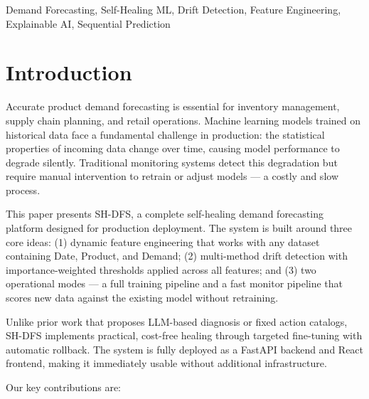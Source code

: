 \documentclass[conference]{IEEEtran}
\begin{document}
\begin{IEEEkeywords}
Demand Forecasting, Self-Healing ML, Drift Detection, Feature Engineering, Explainable AI, Sequential Prediction
\end{IEEEkeywords}

\section{Introduction}

Accurate product demand forecasting is essential for inventory management, supply chain planning, and retail operations. Machine learning models trained on historical data face a fundamental challenge in production: the statistical properties of incoming data change over time, causing model performance to degrade silently. Traditional monitoring systems detect this degradation but require manual intervention to retrain or adjust models — a costly and slow process.

This paper presents SH-DFS, a complete self-healing demand forecasting platform designed for production deployment. The system is built around three core ideas: (1) dynamic feature engineering that works with any dataset containing Date, Product, and Demand; (2) multi-method drift detection with importance-weighted thresholds applied across all features; and (3) two operational modes — a full training pipeline and a fast monitor pipeline that scores new data against the existing model without retraining.

Unlike prior work that proposes LLM-based diagnosis \cite{rauba2024self} or fixed action catalogs, SH-DFS implements practical, cost-free healing through targeted fine-tuning with automatic rollback. The system is fully deployed as a FastAPI backend and React frontend, making it immediately usable without additional infrastructure.

Our key contributions are:
\end{document}
